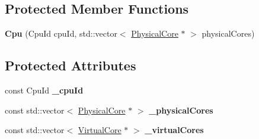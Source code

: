 \subsection*{Protected Member Functions}
\begin{DoxyCompactItemize}
\item 
\hypertarget{classmammut_1_1topology_1_1Cpu_a4a0b062cc466fb3e2fba89eeb959b72b}{{\bfseries Cpu} (Cpu\-Id cpu\-Id, std\-::vector$<$ \hyperlink{classmammut_1_1topology_1_1PhysicalCore}{Physical\-Core} $\ast$ $>$ physical\-Cores)}\label{classmammut_1_1topology_1_1Cpu_a4a0b062cc466fb3e2fba89eeb959b72b}

\end{DoxyCompactItemize}
\subsection*{Protected Attributes}
\begin{DoxyCompactItemize}
\item 
\hypertarget{classmammut_1_1topology_1_1Cpu_a9d1c9b790b7b2ecc254f1936d35c6210}{const Cpu\-Id {\bfseries \-\_\-cpu\-Id}}\label{classmammut_1_1topology_1_1Cpu_a9d1c9b790b7b2ecc254f1936d35c6210}

\item 
\hypertarget{classmammut_1_1topology_1_1Cpu_a9eee9dd8b3d7e223ada75c0d0be08fd9}{const std\-::vector$<$ \hyperlink{classmammut_1_1topology_1_1PhysicalCore}{Physical\-Core} $\ast$ $>$ {\bfseries \-\_\-physical\-Cores}}\label{classmammut_1_1topology_1_1Cpu_a9eee9dd8b3d7e223ada75c0d0be08fd9}

\item 
\hypertarget{classmammut_1_1topology_1_1Cpu_aa6ad4ed0b1314eb6282ca9bd84dc5e8b}{const std\-::vector$<$ \hyperlink{classmammut_1_1topology_1_1VirtualCore}{Virtual\-Core} $\ast$ $>$ {\bfseries \-\_\-virtual\-Cores}}\label{classmammut_1_1topology_1_1Cpu_aa6ad4ed0b1314eb6282ca9bd84dc5e8b}

\end{DoxyCompactItemize}


